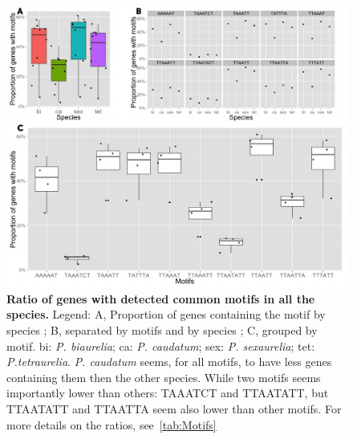 \documentclass[10pt]{article}
\begin{document}
\begin{figure}[!ht]
\begin{center}
\includegraphics[scale=0.5]{Figures/PropFigure.pdf}
\end{center}
\caption{
{\bf Ratio of genes with detected common motifs in all the species.} Legend: A, Proportion of genes containing the motif by species ; B, separated by motifs and by species ; C, grouped by motif. bi: \textit{P. biaurelia}; ca: \textit{P. caudatum}; sex: \textit{P. sexaurelia}; tet: \textit{P.tetraurelia}. \textit{P. caudatum} seems, for all motifs, to have less genes containing them then the other species. While two motifs seems importantly lower than others: TAAATCT and TTAATATT, but TTAATATT and TTAATTA seem also lower than other motifs. For more details on the ratios, see~\autoref{tab:Motifs}
}
\label{fig:PropFigure}
\end{figure}



\clearpage

\end{document}
